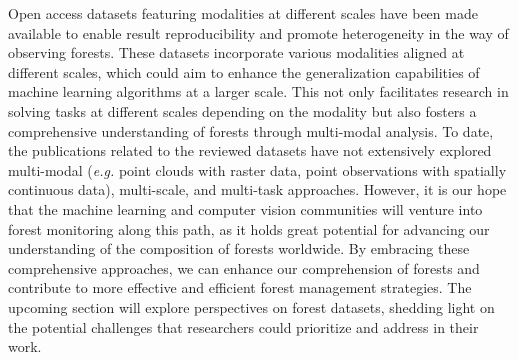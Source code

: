 \documentclass{CUP-JNL-DTM}%
\theoremstyle{definition}
\numberwithin{equation}{section}
\begin{document}
Open access datasets featuring modalities at different scales have been made available to enable result reproducibility and promote heterogeneity in the way of observing forests. 
These datasets incorporate various modalities aligned at different scales, which could aim to enhance the generalization capabilities of machine learning algorithms at a larger scale. 
This not only facilitates research in solving tasks at different scales depending on the modality but also fosters a comprehensive understanding of forests through multi-modal analysis.
%
To date, the publications related to the reviewed datasets have not extensively explored multi-modal (\textit{e.g.} point clouds with raster data, point observations with spatially continuous data), multi-scale, and multi-task approaches. 
However, it is our hope that the machine learning and computer vision communities will venture into forest monitoring along this path, as it holds great potential for advancing our understanding of the composition of forests worldwide. 
By embracing these comprehensive approaches, we can enhance our comprehension of forests and contribute to more effective and efficient forest management strategies.
%
The upcoming section will explore perspectives on forest datasets, shedding light on the potential challenges that researchers could prioritize and address in their work.
\end{document}
